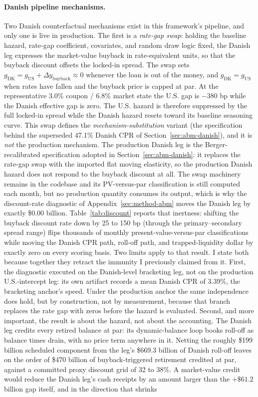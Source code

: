 \documentclass[12pt]{article}
\begin{document}
\paragraph{Danish pipeline mechanisms.}
Two Danish counterfactual mechanisms exist in this framework's pipeline, and only one is live in production. The first is a \emph{rate-gap swap}: holding the baseline hazard, rate-gap coefficient, covariates, and random draw logic fixed, the Danish leg expresses the market-value buyback in rate-equivalent units, so that the buyback discount offsets the locked-in spread. The swap sets $g_{\mathrm{DK}} = g_{\mathrm{US}} + \Delta y_{\mathrm{buyback}} \approx 0$ whenever the loan is out of the money, and $g_{\mathrm{DK}} = g_{\mathrm{US}}$ when rates have fallen and the buyback price is capped at par. At the representative 3.0\% coupon / 6.8\% market state the U.S. gap is $-380$ bp while the Danish effective gap is zero. The U.S. hazard is therefore suppressed by the full locked-in spread while the Danish hazard resets toward its baseline seasoning curve. This swap defines the \emph{mechanism-substitution} variant (the specification behind the superseded 47.1\% Danish CPR of Section~\ref{sec:abm-danish}), and it is \emph{not} the production mechanism. The production Danish leg is the Berger-recalibrated specification adopted in Section~\ref{sec:abm-danish}: it replaces the rate-gap swap with the imported flat moving elasticity, so the production Danish hazard does not respond to the buyback discount at all. The swap machinery remains in the codebase and its PV-versus-par classification is still computed each month, but no production quantity consumes its output, which is why the discount-rate diagnostic of Appendix~\ref{sec:method-abm} moves the Danish leg by exactly \$0.00 billion. Table~\ref{tab:discount} reports that inertness: shifting the buyback discount rate down by 25 to 150 bp (through the primary--secondary spread range) flips thousands of monthly present-value-versus-par classifications while moving the Danish CPR path, roll-off path, and trapped-liquidity dollar by exactly zero on every scoring basis. Two limits apply to that result. I state both because together they retract the immunity I previously claimed from it. First, the diagnostic executed on the Danish-level bracketing leg, not on the production U.S.-intercept leg: its own artifact records a mean Danish CPR of 3.39\%, the bracketing anchor's speed. Under the production anchor the same independence does hold, but by construction, not by measurement, because that branch replaces the rate gap with zeros before the hazard is evaluated. Second, and more important, the result is about the hazard, not about the accounting. The Danish leg credits every retired balance at par: its dynamic-balance loop books roll-off as balance times drain, with no price term anywhere in it. Netting the roughly \$199 billion scheduled component from the leg's \$669.3 billion of Danish roll-off leaves on the order of \$470 billion of buyback-triggered retirement credited at par, against a committed proxy discount grid of 32 to 38\%. A market-value credit would reduce the Danish leg's cash receipts by an amount larger than the $+\$61.2$ billion gap itself, and in the direction that shrinks 
\end{document}

